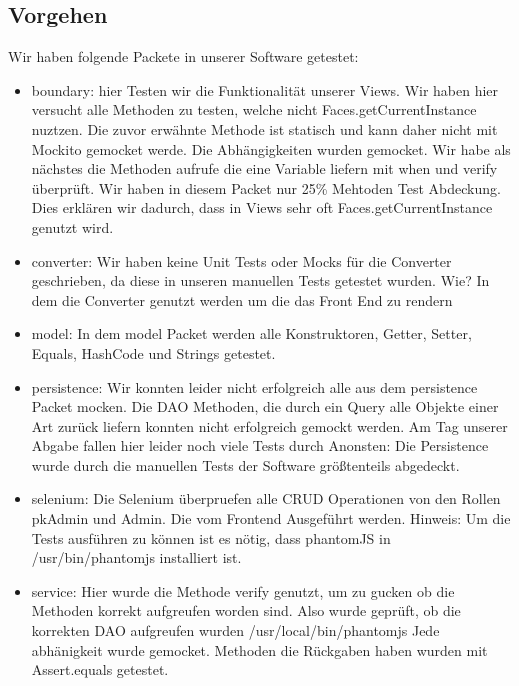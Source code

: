 \documentclass[enabledeprecatedfontcommands,fontsize=12pt,paper=a4,twoside]{scrartcl}
\begin{document}
\subsection{Vorgehen}

Wir haben folgende Packete in unserer Software getestet:
\begin{itemize}
  \item boundary: hier Testen wir die Funktionalität unserer Views. Wir haben
  hier versucht alle Methoden zu testen, welche nicht Faces.getCurrentInstance
  nuztzen. Die zuvor erwähnte Methode ist statisch und kann daher nicht mit
  Mockito gemocket werde. Die Abhängigkeiten wurden gemocket. Wir habe als
  nächstes die Methoden aufrufe die eine Variable liefern mit when und verify
  überprüft.
  Wir haben in diesem Packet nur 25\% Mehtoden Test Abdeckung. Dies erklären wir
  dadurch, dass in Views sehr oft Faces.getCurrentInstance genutzt wird.

  \item converter: Wir haben keine Unit Tests oder Mocks für die Converter
  geschrieben, da diese in unseren manuellen Tests getestet wurden. Wie? In dem
  die Converter genutzt werden um die das Front End zu rendern

  \item model: In dem model Packet werden alle Konstruktoren, Getter, Setter, Equals, HashCode
  und Strings getestet.

  \item persistence: Wir konnten leider nicht erfolgreich alle aus dem
  persistence Packet mocken. Die DAO Methoden, die durch ein Query alle Objekte
  einer Art zurück liefern konnten nicht erfolgreich gemockt werden. Am Tag
  unserer Abgabe fallen hier leider noch viele Tests durch
  Anonsten: Die Persistence wurde durch die manuellen Tests der Software größtenteils abgedeckt.

  \item selenium: Die Selenium überpruefen alle CRUD Operationen von den Rollen pkAdmin
  und Admin. Die vom Frontend Ausgeführt werden. Hinweis: Um die Tests ausführen
  zu können ist es nötig, dass phantomJS in /usr/bin/phantomjs installiert ist.

  \item service: Hier wurde die Methode verify genutzt, um zu gucken ob die
  Methoden korrekt aufgreufen worden sind. Also wurde geprüft, ob die korrekten
  DAO aufgreufen wurden /usr/local/bin/phantomjs
  Jede abhänigkeit wurde gemocket. Methoden die Rückgaben haben wurden mit
  Assert.equals getestet.
\end{itemize}
\end{document}

